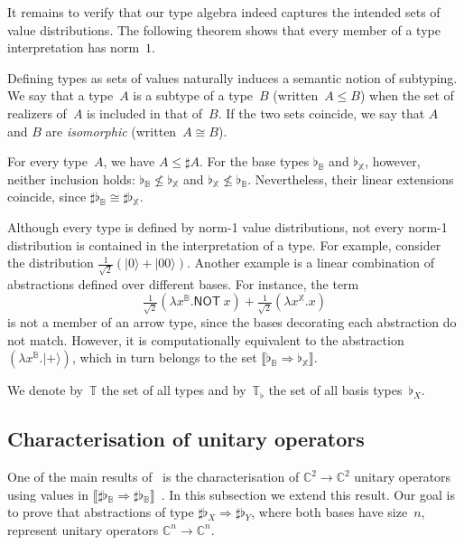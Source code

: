 \documentclass[runningheads,orivec,envcountsame,envcountsect]{llncs}
\providecommand{\qed}{\hbox{\rule{1ex}{1ex}}}%
\newcommand\ket[1]{\ensuremath{|#1\rangle}}
\def\C{\mathbb{C}}            %
\def\Sph{\mathcal{S}_1}       %
\def\Lam#1#2#3{\lambda#1^{#2}{.}#3} %
\def\Arr{\Rightarrow}
\def\Type{\mathbb{T}}
\def\BasisType{\Type_\flat}
\def\sem#1{\llbracket#1\rrbracket}
\newcommand\B{\mathbb B}
\newcommand\XB{\mathbb X}
\newcommand{\pauliX}[1]{\mathsf{NOT}\ #1}
\newcommand\basis[1]{\ensuremath{\flat_{#1}}}
\begin{document}
It remains to verify that our type algebra indeed captures the intended sets of
value distributions. The following theorem shows that every member of a type
interpretation has norm~$1$.


Defining types as sets of values naturally induces a semantic notion of
subtyping. We say that a type~$A$ is a subtype of a type~$B$
(written~$A\leq B$) when the set of realizers of~$A$ is included in that of~$B$.
If the two sets coincide, we say that $A$ and $B$ are \emph{isomorphic}
(written~$A\cong B$).

\begin{example}
  For every type~$A$, we have $A\leq\sharp A$.
  For the base types $\basis{\B}$ and $\basis{\XB}$, however,
  neither inclusion holds:
    $\basis{\B}\not\leq\basis{\XB}$ and
    $\basis{\XB}\not\leq\basis{\B}$.
  Nevertheless, their linear extensions coincide,
  since $\sharp\basis{\B}\cong\sharp\basis{\XB}$.
\end{example}

Although every type is defined by norm-1 value distributions, not every
norm-1 distribution is contained in the interpretation of a type.
For example, consider the distribution
$\tfrac{1}{\sqrt{2}}(\ket{0} + \ket{00})$.
Another example is a linear combination of abstractions defined over different
bases. For instance, the term
\[
  \tfrac{1}{\sqrt{2}}(\Lam{x}{{\B}}{\pauliX{x}})
  + \tfrac{1}{\sqrt{2}}(\Lam{x}{{\XB}}{x})
\]
is not a member of an arrow type, since the bases decorating each abstraction
do not match. However, it is computationally equivalent to the abstraction
$(\Lam{x}{{\B}}{\ket{+}})$, which in turn belongs to the set
$\sem{\basis{\B}\Arr\basis{\XB}}$.


We denote by~$\Type$ the set of all types and by~$\BasisType$ the set of all
basis types~$\basis{X}$.

\subsection{Characterisation of unitary operators}


One of the main results of~\cite{DiazcaroGuillermoMiquelValironLICS19}
is the characterisation of $\C^2\to\C^2$ unitary operators using values in
$\sem{\sharp\basis{\B}\Arr\sharp\basis{\B}}$~\cite[Theorem IV.12]{DiazcaroGuillermoMiquelValironLICS19}.
In this subsection we extend this result. Our goal is to prove that abstractions
of type $\sharp\basis{X}\Arr\sharp\basis{Y}$, where both bases have size~$n$,
represent unitary operators
$\C^n\to\C^n$.
\end{document}
